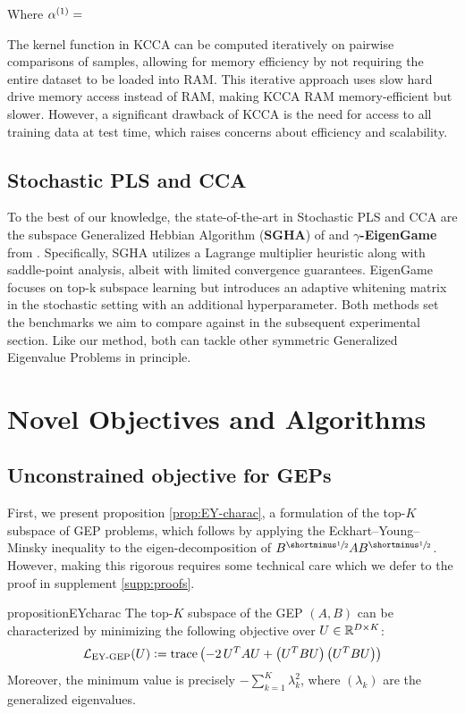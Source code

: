 Where \(\alpha^{(1)}=\)

The kernel function in KCCA can be computed iteratively on pairwise comparisons of samples, allowing for memory efficiency by not requiring the entire dataset to be loaded into RAM.
This iterative approach uses slow hard drive memory access instead of RAM, making KCCA RAM memory-efficient but slower.
However, a significant drawback of KCCA is the need for access to all training data at test time, which raises concerns about efficiency and scalability.


\subsection{Stochastic PLS and CCA}


To the best of our knowledge, the state-of-the-art in Stochastic PLS and CCA are the subspace Generalized Hebbian Algorithm (\textbf{SGHA}) of \cite{chen2019constrained} and \textbf{$\gamma$-EigenGame} from \cite{gemp20,gemp2021}. Specifically, SGHA utilizes a Lagrange multiplier heuristic along with saddle-point analysis, albeit with limited convergence guarantees. EigenGame focuses on top-k subspace learning but introduces an adaptive whitening matrix in the stochastic setting with an additional hyperparameter. Both methods set the benchmarks we aim to compare against in the subsequent experimental section. Like our method, both can tackle other symmetric Generalized Eigenvalue Problems in principle.


\section{Novel Objectives and Algorithms}\label{sec:contributions}
\subsection{Unconstrained objective for GEPs}\label{sec:gep-ey-formulation}
First, we present proposition \ref{prop:EY-charac}, a formulation of the top-$K$ subspace of GEP problems, which follows by applying the Eckhart--Young--Minsky inequality \citep{stewart_matrix_1990} to the eigen-decomposition of $B^\mhalf A B^\mhalf$. However, making this rigorous requires some technical care which we defer to the proof in supplement \ref{supp:proofs}.

\begin{restatable}{proposition}{EYcharac}
    \label{prop:EY-charac}
    The top-$K$ subspace of the GEP $(A,B)$ can be characterized by minimizing the following objective over $U \in \mathbb{R}^{D \times K}$:
    \begin{align}\label{eq:EY-charac}
    \mathcal{L}_\text{EY-GEP}(U) \vcentcolon= \operatorname{trace} \left( - 2\,U^T A U + \left(U^T B U\right) \left(U^T B U\right) \right)
    \end{align}
    Moreover, the minimum value is precisely $- \sum_{k=1}^K \lambda_k^2$, where $(\lambda_k)$ are the generalized eigenvalues.
\end{restatable}

